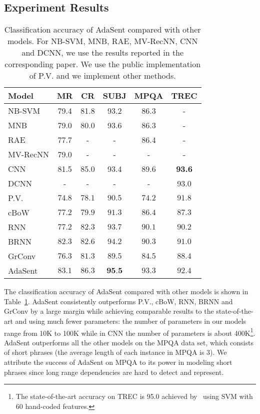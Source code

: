 \documentclass{article}
\theoremstyle{definition}
\begin{document}
\subsection{Experiment Results}
\begin{table}[htb]
\centering
\begin{tabular}{l||c|c|c|c|c}\hline
\textbf{Model} & MR & CR & SUBJ & MPQA & TREC \\\hline
NB-SVM & 79.4 & 81.8 & 93.2 & 86.3 & - \\
MNB & 79.0 & 80.0 & 93.6 & 86.3 & - \\
RAE &  77.7 & - & - & 86.4 & - \\
MV-RecNN & 79.0 & - & - & - & - \\
CNN & 81.5 & 85.0 & 93.4 & 89.6 & \textbf{93.6} \\
DCNN & - & - & - & - & 93.0 \\\hline
P.V. & $74.8$ & $78.1$ & $90.5$ & $74.2$ & $91.8$ \\\hline
cBoW & $77.2$ & $79.9$ & $91.3$ & $86.4$ & $87.3$ \\
RNN & $77.2$ & $82.3$ & $93.7$ & $90.1$ & $90.2$ \\
BRNN & $82.3$ & $82.6$ & $94.2$ & $90.3$ & $91.0$ \\
GrConv & $76.3$ & $81.3$ & $89.5$ & $84.5$ & $88.4$ \\\hline
AdaSent & $\mathbf{83.1}$ & $\mathbf{86.3}$ & $\textbf{95.5}$ & $\mathbf{93.3}$ & $92.4$\\\hline
\end{tabular}
\caption{Classification accuracy of AdaSent compared with other models. For NB-SVM, MNB, RAE, MV-RecNN, CNN and DCNN, we use the results reported in the corresponding paper. We use the public implementation of P.V. and we implement other methods.}
\label{table:result}
\end{table}

The classification accuracy of AdaSent compared with other models is shown in Table~\ref{table:result}. AdaSent consistently outperforms P.V., cBoW, RNN, BRNN and GrConv by a large margin while achieving comparable results to the state-of-the-art and using much fewer parameters: the number of parameters in our models range from 10K to 100K while in CNN the number of parameters is about 400K\footnote{The state-of-the-art accuracy on TREC is 95.0 achieved by~\cite{silva2011symbolic} using SVM with 60 hand-coded features.}. AdaSent outperforms all the other models on the MPQA data set, which consists of short phrases (the average length of each instance in MPQA is 3). We attribute the success of AdaSent on MPQA to its power in modeling short phrases since long range dependencies are hard to detect and represent.
\end{document}
